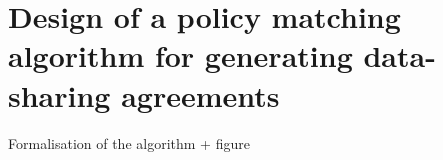 \section{Design of a policy matching algorithm for generating data-sharing agreements}
\label{sec:algorithm}

Formalisation of the algorithm + figure